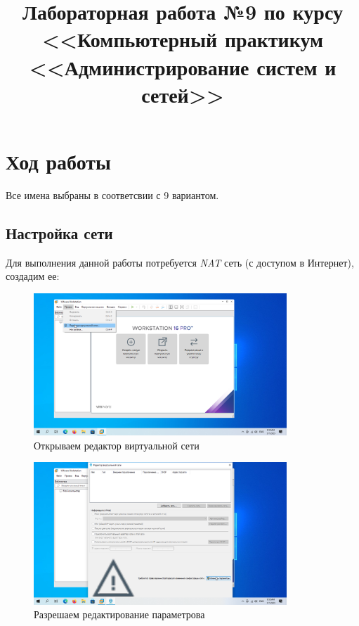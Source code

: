 \documentclass[a4paper]{article}
\title{
  Лабораторная работа №9 по курсу \\
  <<Компьютерный практикум <<Администрирование систем и сетей>>  
}
\begin{document}
  \templatedtitlepage
  
  \toc
  \section{Ход работы}

  Все имена выбраны в соответсвии с 9 вариантом.

  \subsection{Настройка сети}

  Для выполнения данной работы потребуется \textit{NAT} сеть (с доступом в Интернет),
  создадим ее:

  \begin{figure}[H]
    \centering
    \includegraphics[width=0.85\textwidth]{9_0001}
    \caption{Открываем редактор виртуальной сети}
    \label{img:0001}
  \end{figure}

  \begin{figure}[H]
    \centering
    \includegraphics[width=0.85\textwidth]{9_0002}
    \caption{Разрешаем редактирование параметрова}
    \label{img:0002}
  \end{figure}
\end{document}

